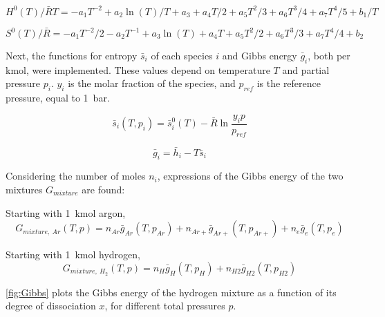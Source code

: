         \begin{equation}
            H^0 (T)/\bar RT = -a_1 T^{-2} + a_2 \ln(T)/T + a_3 + a_4 T / 2 + a_5 {T^2}/3 + a_6 {T^3}/4 + a_7 {T^4}/5 + b_1/T
        \end{equation}
        
        \begin{equation}
            S^0(T)/\bar R = -a_1 T^{-2}/2 - a_2 T^{-1} + a_3\ln(T) + a_4   T + a_5 {T^2}/2 + a_6 T^3/3 + a_7 T^4/4 + b_2
        \end{equation}

        Next, the functions for entropy $\bar s_i$ of each species $i$ and Gibbs energy $\bar g_i$, both per \unit{kmol}, were implemented. These values depend on temperature $T$ and partial pressure $p_i$. $y_i$ is the molar fraction of the species, and $p_{ref}$ is the reference pressure, equal to \qty{1}{bar}.
        
        \begin{equation}
            \bar s_i (T, p_i) = \bar s_i^0 (T) - \bar R \ln \frac{y_i p}{p_{ref}}
        \end{equation}

        \begin{equation}
            \bar g_i = \bar h_i - T \bar s_i
        \end{equation}

        Considering the number of moles $n_i$, expressions of the Gibbs energy of the two mixtures $G_{mixture}$ are found:

        Starting with \qty{1}{kmol} argon,
        \begin{equation}
            G_{mixture,\: Ar}(T, p) = n_{Ar} \bar g_{Ar}(T, p_{Ar}) + n_{Ar+} \bar g_{Ar+}(T, p_{Ar+}) + n_e \bar g_e(T, p_e)
        \end{equation}

        Starting with \qty{1}{kmol} hydrogen,
        \begin{equation}
            G_{mixture,\: H_2}(T, p) = n_H \bar g_H(T, p_H) + n_{H2} \bar g_{H2}(T, p_{H2})
        \end{equation}

        \autoref{fig:Gibbs} plots the Gibbs energy of the hydrogen mixture as a function of its degree of dissociation $x$, for different total pressures $p$.

